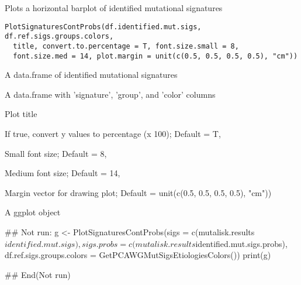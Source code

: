 \documentclass[letterpaper]{book}
\begin{document}
%
\begin{Description}\relax
Plots a horizontal barplot of identified mutational signatures
\end{Description}
%
\begin{Usage}
\begin{verbatim}
PlotSignaturesContProbs(df.identified.mut.sigs, df.ref.sigs.groups.colors,
  title, convert.to.percentage = T, font.size.small = 8,
  font.size.med = 14, plot.margin = unit(c(0.5, 0.5, 0.5, 0.5), "cm"))
\end{verbatim}
\end{Usage}
%
\begin{Arguments}
\begin{ldescription}
\item[\code{df.identified.mut.sigs}] A data.frame of identified mutational signatures

\item[\code{df.ref.sigs.groups.colors}] A data.frame with 'signature', 'group', and 'color' columns

\item[\code{title}] Plot title

\item[\code{convert.to.percentage}] If true, convert y values to percentage (x 100); Default = T,

\item[\code{font.size.small}] Small font size; Default = 8,

\item[\code{font.size.med}] Medium font size; Default = 14,

\item[\code{plot.margin}] Margin vector for drawing plot; Default = unit(c(0.5, 0.5, 0.5, 0.5), "cm"))
\end{ldescription}
\end{Arguments}
%
\begin{Value}
A ggplot object
\end{Value}
%
\begin{Examples}
\begin{ExampleCode}
## Not run: 
 g <- PlotSignaturesContProbs(sigs = c(mutalisk.results$identified.mut.sigs),
 sigs.probs = c(mutalisk.results$identified.mut.sigs.probs),
 df.ref.sigs.groups.colors = GetPCAWGMutSigsEtiologiesColors())
 print(g)

## End(Not run)
\end{ExampleCode}
\end{Examples}
\end{document}
